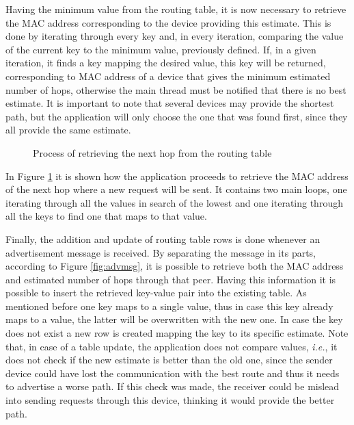 Having the minimum value from the routing table, it is now necessary to retrieve the \gls{MAC} address corresponding to the device providing this estimate. This is done by iterating through every key and, in every iteration, comparing the value of the current key to the minimum value, previously defined. If, in a given iteration, it finds a key mapping the desired value, this key will be returned, corresponding to \gls{MAC} address of a device that gives the minimum estimated number of hops, otherwise the main thread must be notified that there is no best estimate. It is important to note that several devices may provide the shortest path, but the application will only choose the one that was found first, since they all provide the same estimate.

\begin{figure}[ht]
	\noindent{}
	\caption{\label{fig:nexthoprqt} Process of retrieving the next hop from the routing table}
\end{figure}

In Figure \ref{fig:nexthoprqt} it is shown how the application proceeds to retrieve the \gls{MAC} address of the next hop where a new request will be sent. It contains two main loops, one iterating through all the values in search of the lowest and one iterating through all the keys to find one that maps to that value.

Finally, the addition and update of routing table rows is done whenever an advertisement message is received. By separating the message in its parts, according to Figure \ref{fig:advmsg}, it is possible to retrieve both the \gls{MAC} address and estimated number of hops through that peer. Having this information it is possible to insert the retrieved key-value pair into the existing table. As mentioned before one key maps to a single value, thus in case this key already maps to a value, the latter will be overwritten with the new one. In case the key does not exist a new row is created mapping the key to its specific estimate. Note that, in case of a table update, the application does not compare values, \textit{i.e.}, it does not check if the new estimate is better than the old one, since the sender device could have lost the communication with the best route and thus it needs to advertise a worse path. If this check was made, the receiver could be mislead into sending requests through this device, thinking it would provide the better path.

